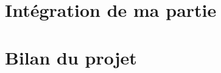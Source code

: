 \documentclass[12pt, a4paper]{article}
\begin{document}

\section{Intégration de ma partie}




\section{Bilan du projet}




\end{document}
